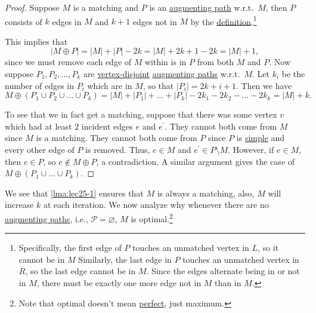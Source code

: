 \begin{proof}
	Suppose \(M\) is a matching and \(P\) is an \hyperref[def:augmenting-path]{augmenting path} w.r.t.\ \(M\), then \(P\) consists of \(k\) edges in \(M\) and \(k+1\) edges not in \(M\) by the \hyperref[def:augmenting-path]{definition}.\footnote{Specifically, the first edge of \(P\) touches an unmatched vertex in \(L\), so it cannot be in \(M\) Similarly, the last edge in \(P\) touches an unmatched vertex in \(R\), so the last edge cannot be in \(M\). Since the edges alternate being in or not in \(M\), there must be exactly one more edge not in \(M\) than in \(M\).}

	This implies that
	\[
		\left\vert M\oplus P \right\vert = \left\vert M \right\vert + \left\vert P \right\vert - 2k = \left\vert M \right\vert + 2k + 1 - 2k = \left\vert M \right\vert + 1,
	\]
	since we must remove each edge of \(M\) within is in \(P\) from both \(M\) and \(P\). Now suppose \(P_1, P_2, \ldots  , P_k\) are \hyperref[def:vertex-independent]{vertex-disjoint} \hyperref[def:augmenting-path]{augmenting paths} w.r.t.\ \(M\). Let \(k_i\) be the number of edges in \(P_{i} \) which are in \(M\), so that \(\left\vert P_{i}  \right\vert = 2k + i + 1\). Then we have
	\[
		M \oplus (P_1 \cup P_2 \cup  \ldots  \cup P_k)= \left\vert M \right\vert + \left\vert P_1 \right\vert + \ldots  + \left\vert P_k \right\vert
		- 2k_1 - 2k_2 - \ldots  - 2k_k = \left\vert M \right\vert + k.
	\]

	To see that we in fact get a matching, suppose that there was some vertex \(v\) which had at least \(2\) incident edges \(e\) and \(e^\prime \). They cannot both come from \(M\) since \(M\) is a matching. They cannot both come from \(P\) since \(P\) is \hyperref[def:simple-path]{simple} and every other edge of \(P\) is removed. Thus, \(e\in M\) and \(e^\prime \in P\setminus M\). However, if \(e\in M\), then \(e\in P\), so \(e \notin M\oplus P\), a contradiction. A similar argument gives the case of \(M\oplus (P_1 \cup \ldots \cup P_k )\).
\end{proof}

We see that \autoref{lma:lec25-1} ensures that \(M\) is always a matching, also, \(M\) will increase \(k\) at each iteration. We now analyze why whenever there are no \hyperref[def:augmenting-path]{augmenting paths}, i.e., \(\mathcal{P} = \varnothing \), \(M\) is optimal.\footnote{Note that optimal doesn't mean \hyperref[def:perfect-matching]{perfect}, just maximum.}

